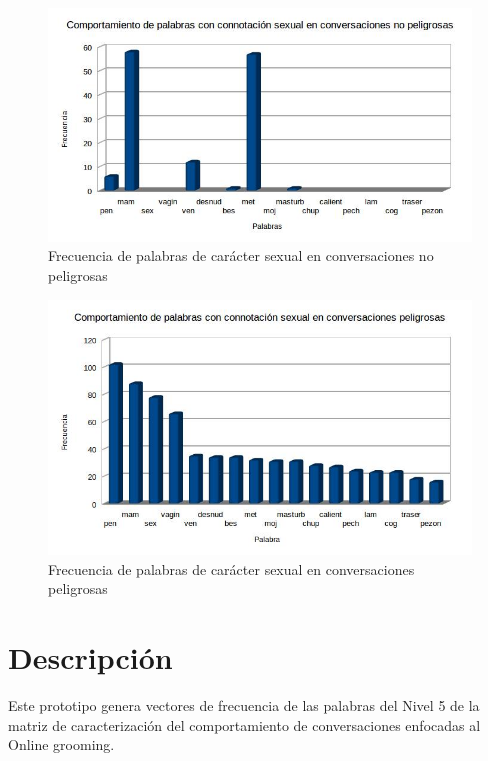 \begin{figure}[h]
\begin{center}
	\includegraphics[scale=.6]{images/palabrassexuales1}
	\caption{Frecuencia de palabras de car\'acter sexual en conversaciones no peligrosas}
	\label{fig:graficasexual1}
\end{center}
\end{figure}


\begin{figure}[h]
\begin{center}
	\includegraphics[scale=.6]{images/palabrassexuales2}
	\caption{Frecuencia de palabras de car\'acter sexual en conversaciones peligrosas}
	\label{fig:graficasexual2}
\end{center}
\end{figure}

\section{Descripci\'on}

Este prototipo genera vectores de frecuencia de las palabras del Nivel 5 de la matriz de caracterizaci\'on del comportamiento de conversaciones enfocadas al Online grooming.
